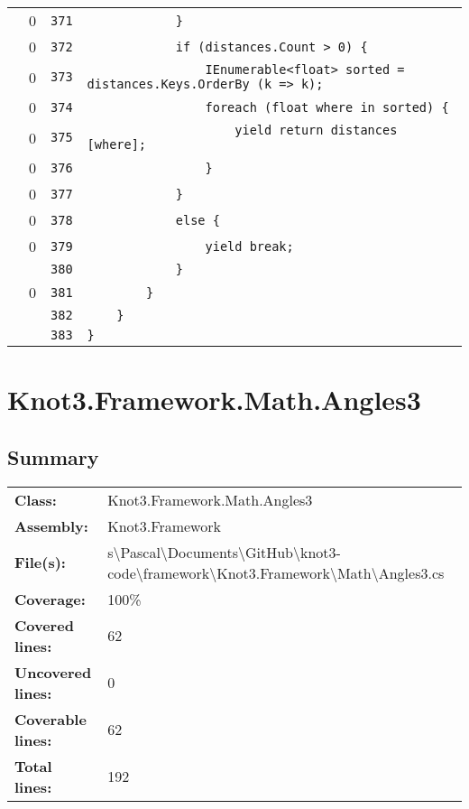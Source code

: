\documentclass[a4paper,10pt]{article}
\begin{document}
\begin{longtable}[l]{lrrl}
\cellcolor{red} & 0 & \verb~371~ & \verb~            }~\\
\cellcolor{red} & 0 & \verb~372~ & \verb~            if (distances.Count > 0) {~\\
\cellcolor{red} & 0 & \verb~373~ & \verb~                IEnumerable<float> sorted = distances.Keys.OrderBy (k => k);~\\
\cellcolor{red} & 0 & \verb~374~ & \verb~                foreach (float where in sorted) {~\\
\cellcolor{red} & 0 & \verb~375~ & \verb~                    yield return distances [where];~\\
\cellcolor{red} & 0 & \verb~376~ & \verb~                }~\\
\cellcolor{red} & 0 & \verb~377~ & \verb~            }~\\
\cellcolor{red} & 0 & \verb~378~ & \verb~            else {~\\
\cellcolor{red} & 0 & \verb~379~ & \verb~                yield break;~\\
\cellcolor{gray} &  & \verb~380~ & \verb~            }~\\
\cellcolor{red} & 0 & \verb~381~ & \verb~        }~\\
\cellcolor{gray} &  & \verb~382~ & \verb~    }~\\
\cellcolor{gray} &  & \verb~383~ & \verb~}~\\
\end{longtable}
\newpage
\section{Knot3.Framework.Math.Angles3}
\subsection{Summary}
\begin{longtable}[l]{ll}
\textbf{Class:} & Knot3.Framework.Math.Angles3\\
\textbf{Assembly:} & Knot3.Framework\\
\textbf{File(s):} & \begin{minipage}[t]{12cm}{s\textbackslash Pascal\textbackslash Documents\textbackslash GitHub\textbackslash knot3-code\textbackslash framework\textbackslash Knot3.Framework\textbackslash Math\textbackslash Angles3.cs}\end{minipage} \\
\textbf{Coverage:} & 100\%\\
\textbf{Covered lines:} & 62\\
\textbf{Uncovered lines:} & 0\\
\textbf{Coverable lines:} & 62\\
\textbf{Total lines:} & 192\\
\end{longtable}
\end{document}
